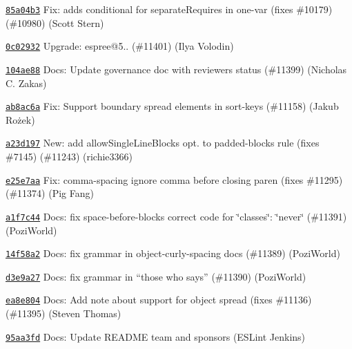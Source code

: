 \begin{DoxyItemize}
\item \href{https://github.com/eslint/eslint/commit/85a04b319e6dfde1458174cd1d8c9e7d33da0871}{\texttt{ {\ttfamily 85a04b3}}} Fix\+: adds conditional for separate\+Requires in one-\/var (fixes \#10179) (\#10980) (Scott Stern)
\item \href{https://github.com/eslint/eslint/commit/0c02932f1b2e2a85809e84617efa1b8836c19cfb}{\texttt{ {\ttfamily 0c02932}}} Upgrade\+: espree@5.. (\#11401) (Ilya Volodin)
\item \href{https://github.com/eslint/eslint/commit/104ae881d0b21e9c64e006b2a2c21535cef0ad28}{\texttt{ {\ttfamily 104ae88}}} Docs\+: Update governance doc with reviewers status (\#11399) (Nicholas C. Zakas)
\item \href{https://github.com/eslint/eslint/commit/ab8ac6adaaf7a88e160899e7f438a4cfd655eb6e}{\texttt{ {\ttfamily ab8ac6a}}} Fix\+: Support boundary spread elements in sort-\/keys (\#11158) (Jakub Rożek)
\item \href{https://github.com/eslint/eslint/commit/a23d1975d48841eafdead1a1357e2af842f688bc}{\texttt{ {\ttfamily a23d197}}} New\+: add allow\+Single\+Line\+Blocks opt. to padded-\/blocks rule (fixes \#7145) (\#11243) (richie3366)
\item \href{https://github.com/eslint/eslint/commit/e25e7aa3ea1e8c9b3cd3242acda6d4a5572c2c6a}{\texttt{ {\ttfamily e25e7aa}}} Fix\+: comma-\/spacing ignore comma before closing paren (fixes \#11295) (\#11374) (Pig Fang)
\item \href{https://github.com/eslint/eslint/commit/a1f7c44ea9efbd9393889c1cc91b74260e0a8e02}{\texttt{ {\ttfamily a1f7c44}}} Docs\+: fix space-\/before-\/blocks correct code for \char`\"{}classes\char`\"{}\+: \char`\"{}never\char`\"{} (\#11391) (Pozi\+World)
\item \href{https://github.com/eslint/eslint/commit/14f58a2bec4d6aade0de22771c378b86b1e51959}{\texttt{ {\ttfamily 14f58a2}}} Docs\+: fix grammar in object-\/curly-\/spacing docs (\#11389) (Pozi\+World)
\item \href{https://github.com/eslint/eslint/commit/d3e9a27bbba30008a610df59e82b7192f0ecc3a3}{\texttt{ {\ttfamily d3e9a27}}} Docs\+: fix grammar in “those who says” (\#11390) (Pozi\+World)
\item \href{https://github.com/eslint/eslint/commit/ea8e8045ba0e6c1e1015104346af962f3e16fd81}{\texttt{ {\ttfamily ea8e804}}} Docs\+: Add note about support for object spread (fixes \#11136) (\#11395) (Steven Thomas)
\item \href{https://github.com/eslint/eslint/commit/95aa3fdb392d265e6c3d813d54076458e88e7ad8}{\texttt{ {\ttfamily 95aa3fd}}} Docs\+: Update R\+E\+A\+D\+ME team and sponsors (E\+S\+Lint Jenkins)

\end{DoxyItemize}
